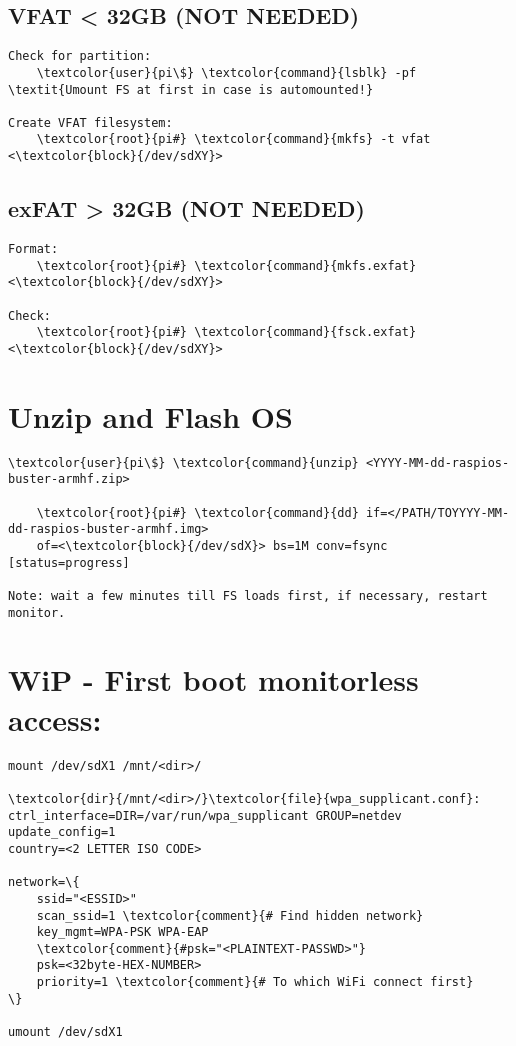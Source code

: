 \documentclass[10pt, a4paper, onecolumn, openany]{book} %
\begin{document}
\subsection{VFAT < 32GB (NOT NEEDED)}
\begin{Verbatim}[commandchars=\\\{\}]
Check for partition:
    \textcolor{user}{pi\$} \textcolor{command}{lsblk} -pf
\textit{Umount FS at first in case is automounted!}

Create VFAT filesystem:
    \textcolor{root}{pi#} \textcolor{command}{mkfs} -t vfat <\textcolor{block}{/dev/sdXY}>
\end{Verbatim}
\subsection{exFAT > 32GB (NOT NEEDED)}
\begin{Verbatim}[commandchars=\\\{\}]
Format:
    \textcolor{root}{pi#} \textcolor{command}{mkfs.exfat} <\textcolor{block}{/dev/sdXY}>
    
Check:
    \textcolor{root}{pi#} \textcolor{command}{fsck.exfat} <\textcolor{block}{/dev/sdXY}>
\end{Verbatim}

\section{Unzip and Flash OS}
\begin{Verbatim}[commandchars=\\\{\}]
    \textcolor{user}{pi\$} \textcolor{command}{unzip} <YYYY-MM-dd-raspios-buster-armhf.zip>

    \textcolor{root}{pi#} \textcolor{command}{dd} if=</PATH/TOYYYY-MM-dd-raspios-buster-armhf.img>    
    of=<\textcolor{block}{/dev/sdX}> bs=1M conv=fsync [status=progress]
    
Note: wait a few minutes till FS loads first, if necessary, restart monitor.
\end{Verbatim}

\section{WiP - First boot monitorless access:}
\begin{Verbatim}[commandchars=\\\{\}]
mount /dev/sdX1 /mnt/<dir>/

\textcolor{dir}{/mnt/<dir>/}\textcolor{file}{wpa_supplicant.conf}:
ctrl_interface=DIR=/var/run/wpa_supplicant GROUP=netdev
update_config=1
country=<2 LETTER ISO CODE>

network=\{
    ssid="<ESSID>"
    scan_ssid=1 \textcolor{comment}{# Find hidden network}
    key_mgmt=WPA-PSK WPA-EAP
    \textcolor{comment}{#psk="<PLAINTEXT-PASSWD>"}
    psk=<32byte-HEX-NUMBER>
    priority=1 \textcolor{comment}{# To which WiFi connect first}
\}

umount /dev/sdX1
\end{Verbatim}
\end{document}
